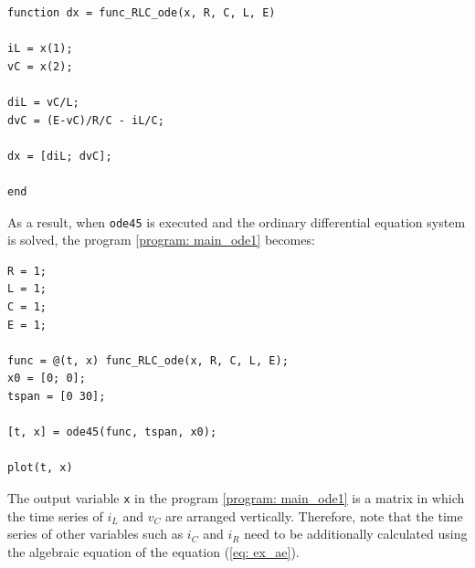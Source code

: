 \documentclass[graybox, envcountchap]{svmult}
\begin{document}
\begin{example}
\smallskip
\begin{PROGRAMA}[count,title={func\_RLC\_ode.m}]\label{program:ex1_ode}
  \begin{verbatim}
function dx = func_RLC_ode(x, R, C, L, E)

iL = x(1);
vC = x(2);

diL = vC/L;
dvC = (E-vC)/R/C - iL/C;

dx = [diL; dvC];

end
\end{verbatim}
\end{PROGRAMA}

As a result, when \verb|ode45| is executed and the ordinary differential equation system is solved, the program \nobreak\ref{program: main_ode1} becomes:

\smallskip
\begin{PROGRAMA}[count,title={main\_RLC\_ode.m}]\label{program:main_ode1}
\begin{verbatim}
R = 1;
L = 1;
C = 1;
E = 1;

func = @(t, x) func_RLC_ode(x, R, C, L, E);
x0 = [0; 0];
tspan = [0 30];

[t, x] = ode45(func, tspan, x0);

plot(t, x)
\end{verbatim}
\end{PROGRAMA}

The output variable \verb|x| in the program \nobreak\ref{program: main_ode1} is a matrix in which the time series of $i_L$ and $v_C$ are arranged vertically.
Therefore, note that the time series of other variables such as $i_C$ and $i_R$ need to be additionally calculated using the algebraic equation of the equation (\ref{eq: ex_ae}).


\end{example}
\end{document}
